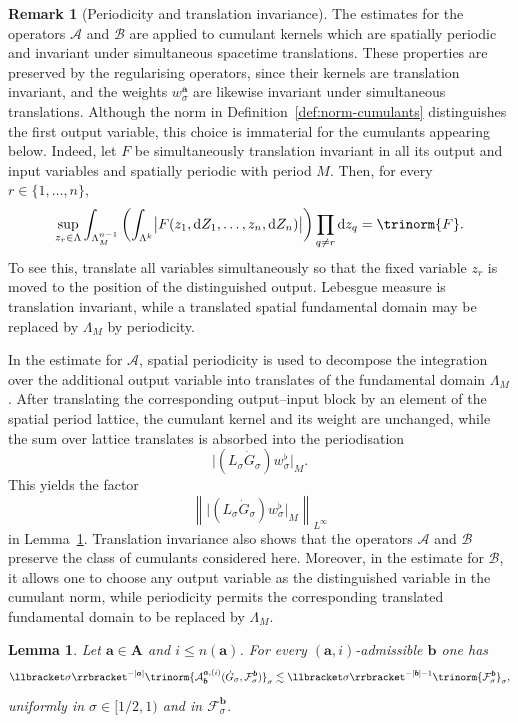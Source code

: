 \documentclass{article}
\numberwithin{equation}{section}
\newcommand{\mathd}{\mathrm{d}}
\theoremstyle{plain}
\newtheorem{lemma}[theorem]{Lemma}
\theoremstyle{definition}
\newtheorem{remark}[theorem]{Remark}
\begin{document}
\begin{remark}[Periodicity and translation invariance]
	\label{rem:periodicity-translation-AB}
	The estimates for the operators $\mathcal A$ and $\mathcal B$ are applied
	to cumulant kernels which are spatially periodic and invariant under
	simultaneous spacetime translations. These properties are preserved by
	the regularising operators, since their kernels are translation invariant,
	and the weights $w_\sigma^{\boldsymbol a}$ are likewise invariant under
	simultaneous translations. 
	Although the norm in Definition~\ref{def:norm-cumulants} distinguishes the
	first output variable, this choice is immaterial for the cumulants appearing
	below. Indeed, let $F$ be simultaneously translation invariant in
	all its output and input variables and spatially periodic with period $M$.
	Then, for every $r\in\{1,\ldots,n\}$,
	\[
	\sup_{z_r\in\Lambda}
	\int_{\Lambda_M^{n-1}}
	\left(\int_{\Lambda^k}
	\bigl|F
	(z_1,\mathd Z_1,\ldots,z_n,\mathd Z_n)\bigr|
	\right)
	\prod_{q\neq r}\mathd z_q
	=
	\trinorm{F}.
	\]
	To see this, translate all variables simultaneously so that the fixed
	variable $z_r$ is moved to the position of the distinguished output.
	Lebesgue measure is translation invariant, while a translated spatial
	fundamental domain may be replaced by $\Lambda_M$ by periodicity.
	
	In the estimate for $\mathcal A$, spatial
	periodicity is used to decompose the integration over the additional
	output variable into translates of the fundamental domain $\Lambda_M$.
	After translating the corresponding output--input block by an element of
	the spatial period lattice, the cumulant kernel and its weight are
	unchanged, while the sum over lattice translates is absorbed into the
	periodisation
	\[
	\bigl|
	(L_\sigma\dot G_\sigma)w_\sigma^\flat
	\bigr|_M.
	\]
	This yields the factor
	\[
	\left\|
	\bigl|
	(L_\sigma\dot G_\sigma)w_\sigma^\flat
	\bigr|_M
	\right\|_{L^\infty}
	\]
	in Lemma~\ref{lem:estimates-A}.
	Translation invariance also shows that the operators $\mathcal A$ and
	$\mathcal B$ preserve the class of cumulants considered here. Moreover,
	in the estimate for $\mathcal B$, it allows one to choose any output
	variable as the distinguished variable in the cumulant norm, while
	periodicity permits the corresponding translated fundamental domain to
	be replaced by $\Lambda_M$.
\end{remark}

\begin{lemma}
	\label{lem:estimates-A}
	Let $\boldsymbol a \in \boldsymbol A$ and
	$i\leqslant n(\boldsymbol a)$. For every
	$(\boldsymbol a,i)$-admissible $\boldsymbol b$ one has
	\[
	\llbracket\sigma\rrbracket^{-[\boldsymbol a]}
	\trinorm{
		\mathcal A^{\boldsymbol a,(i)}_{\boldsymbol b}
		(\dot G_\sigma,\mathcal F^{\boldsymbol b}_\sigma)
	}_\sigma
	\lesssim
	\llbracket\sigma\rrbracket^{-[\boldsymbol b]-1}
	\trinorm{\mathcal F^{\boldsymbol b}_\sigma}_\sigma ,
	\]
	uniformly in $\sigma\in[1/2,1)$ and in
	$\mathcal F^{\boldsymbol b}_\sigma$.
\end{lemma}
\end{document}
